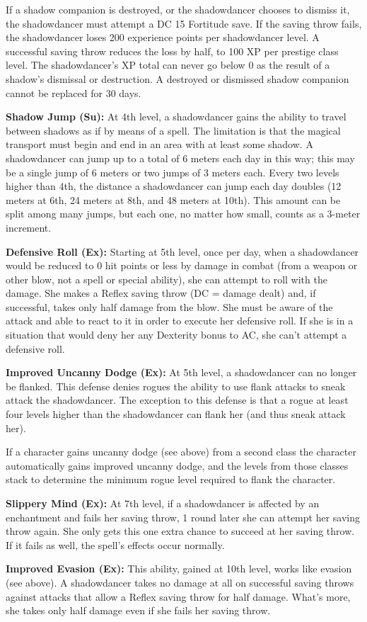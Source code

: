 {If a shadow companion is destroyed, or the shadowdancer chooses to dismiss it, the shadowdancer must attempt a DC 15 Fortitude save. If the saving throw fails, the shadowdancer loses 200 experience points per shadowdancer level. A successful saving throw reduces the loss by half, to 100 XP per prestige class level. The shadowdancer's XP total can never go below 0 as the result of a shadow's dismissal or destruction. A destroyed or dismissed shadow companion cannot be replaced for 30 days.

\textbf{Shadow Jump (Su):} At 4th level, a shadowdancer gains the ability to travel between shadows as if by means of a  spell. The limitation is that the magical transport must begin and end in an area with at least some shadow. A shadowdancer can jump up to a total of 6 meters each day in this way; this may be a single jump of 6 meters or two jumps of 3 meters each. Every two levels higher than 4th, the distance a shadowdancer can jump each day doubles (12 meters at 6th, 24 meters at 8th, and 48 meters at 10th). This amount can be split among many jumps, but each one, no matter how small, counts as a 3-meter increment.

\textbf{Defensive Roll (Ex):} Starting at 5th level, once per day, when a shadowdancer would be reduced to 0 hit points or less by damage in combat (from a weapon or other blow, not a spell or special ability), she can attempt to roll with the damage. She makes a Reflex saving throw (DC = damage dealt) and, if successful, takes only half damage from the blow. She must be aware of the attack and able to react to it in order to execute her defensive roll. If she is in a situation that would deny her any Dexterity bonus to AC, she can't attempt a defensive roll.

\textbf{Improved Uncanny Dodge (Ex):} At 5th level, a shadowdancer can no longer be flanked. This defense denies rogues the ability to use flank attacks to sneak attack the shadowdancer. The exception to this defense is that a rogue at least four levels higher than the shadowdancer can flank her (and thus sneak attack her).

If a character gains uncanny dodge (see above) from a second class the character automatically gains improved uncanny dodge, and the levels from those classes stack to determine the minimum rogue level required to flank the character.

\textbf{Slippery Mind (Ex):} At 7th level, if a shadowdancer is affected by an enchantment and fails her saving throw, 1 round later she can attempt her saving throw again. She only gets this one extra chance to succeed at her saving throw. If it fails as well, the spell's effects occur normally.

\textbf{Improved Evasion (Ex):} This ability, gained at 10th level, works like evasion (see above). A shadowdancer takes no damage at all on successful saving throws against attacks that allow a Reflex saving throw for half damage. What's more, she takes only half damage even if she fails her saving throw.
}
